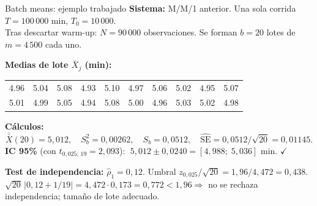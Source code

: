 \documentclass[aspectratio=1610, 10pt]{beamer}
\begin{document}
\begin{frame}{Batch means: ejemplo trabajado}
\textbf{Sistema:} M/M/1 anterior. Una sola corrida $T = 100\,000$ min, $T_0=10\,000$. \\
Tras descartar warm-up: $N = 90\,000$ observaciones. Se forman $b = 20$ lotes de $m = 4\,500$ cada uno.

\vspace{0.2cm}
\textbf{Medias de lote $\bar X_j$ (min):}
\begin{table}
\centering
\scriptsize
\begin{tabular}{cccccccccc}
\toprule
4.96 & 5.04 & 5.08 & 4.93 & 5.10 & 4.97 & 5.06 & 5.02 & 4.95 & 5.07 \\
5.01 & 4.99 & 5.05 & 4.94 & 5.08 & 5.00 & 4.96 & 5.03 & 5.02 & 4.98 \\
\bottomrule
\end{tabular}
\end{table}

\vspace{0.2cm}
\textbf{Cálculos:}
\[
\bar{\bar X}(20) = 5{,}012,\quad S_b^2 = 0{,}00262,\quad S_b = 0{,}0512,\quad \widehat{\mathrm{SE}} = 0{,}0512/\sqrt{20} = 0{,}01145.
\]
\textbf{IC 95\%} (con $t_{0{,}025;\,19} = 2{,}093$): $\;5{,}012 \pm 0{,}0240 = [4{,}988;\; 5{,}036]$ min. \textcolor{deepgreen}{$\checkmark$}

\vspace{0.2cm}
\textbf{Test de independencia:} $\widehat\rho_1 = 0{,}12$. Umbral $z_{0{,}025}/\sqrt{20} = 1{,}96/4{,}472 = 0{,}438$. \\
$\sqrt{20}\,|0{,}12 + 1/19| = 4{,}472 \cdot 0{,}173 = 0{,}772 < 1{,}96 \Rightarrow$ \textcolor{deepgreen}{no se rechaza independencia}; tamaño de lote adecuado.
\end{frame}
\end{document}
